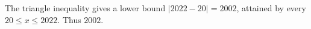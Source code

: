 The triangle inequality gives a lower bound $|2022-20|=2002$, attained by every $20\le x\le2022$. Thus $\boxed{2002}$.
